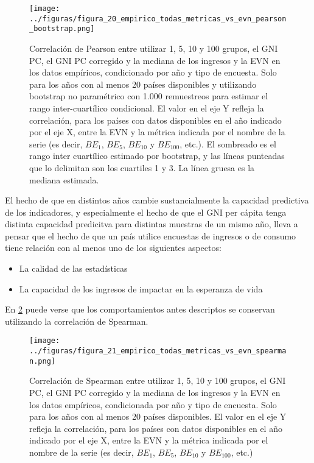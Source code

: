 \begin{figure}[H] %
    \centering %
    \texttt{[image: ../figuras/figura\_20\_empirico\_todas\_metricas\_vs\_evn\_pearson\_bootstrap.png]} %
    \caption{Correlación de Pearson entre utilizar 1, 5, 10 y 100 grupos, el GNI PC, el GNI PC corregido y la mediana de los ingresos y la EVN en los datos empíricos, condicionado por año y tipo de encuesta. Solo para los años con al menos 20 países disponibles y utilizando bootstrap no paramétrico con 1.000 remuestreos para estimar el rango inter-cuartílico condicional. El valor en el eje Y refleja la correlación, para los países con datos disponibles en el año indicado por el eje X, entre la EVN y la métrica indicada por el nombre de la serie (es decir, $BE_1$, $BE_5$, $BE_{10}$ y $BE_{100}$, etc.). El sombreado es el rango inter cuartílico estimado por bootstrap, y las líneas punteadas que lo delimitan son los cuartiles 1 y 3. La línea gruesa es la mediana estimada.
    }
    \label{fig:20} %
\end{figure}


El hecho de que en distintos años cambie sustancialmente la capacidad predictiva de los indicadores, y especialmente el hecho de que el GNI per cápita tenga distinta capacidad predicitva para distintas muestras de un mismo año, lleva a pensar que el hecho de que un país utilice encuestas de ingresos o de consumo tiene relación con al menos uno de los siguientes aspectos:
\begin{itemize}
    \item La calidad de las estadísticas
    \item La capacidad de los ingresos de impactar en la esperanza de vida
\end{itemize}


En \ref{fig:21} puede verse que los comportamientos antes descriptos se conservan utilizando la correlación de Spearman.

\begin{figure}[H] %
    \centering %
    \texttt{[image: ../figuras/figura\_21\_empirico\_todas\_metricas\_vs\_evn\_spearman.png]} %
    \caption{Correlación de Spearman entre utilizar 1, 5, 10 y 100 grupos, el GNI PC, el GNI PC corregido y la mediana de los ingresos y la EVN en los datos empíricos, condicionada por año y tipo de encuesta. Solo para los años con al menos 20 países disponibles. El valor en el eje Y refleja la correlación, para los países con datos disponibles en el año indicado por el eje X, entre la EVN y la métrica indicada por el nombre de la serie (es decir, $BE_1$, $BE_5$, $BE_{10}$ y $BE_{100}$, etc.)
}
    \label{fig:21} %
\end{figure}


